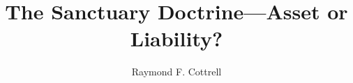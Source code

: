 \documentclass{tufte-book}
\title{The Sanctuary Doctrine---Asset or Liability?}
\author{Raymond F. Cottrell}
\newcommand{\blankpage}{\newpage\hbox{}\thispagestyle{empty}\newpage}
\begin{document}
\frontmatter

\blankpage

\maketitle

\tableofcontents

\listoftables

\cleardoublepage



\mainmatter






\backmatter

\renewcommand{\bibpreamble}{Most of my papers cited in the following notes are 
on file in the Heritage
Room of the Del E.\ Webb Library on the campus of Loma Linda University. The
Association of Adventist Forums is currently planning a website and has
requested a list of all my major papers.}




\end{document}
